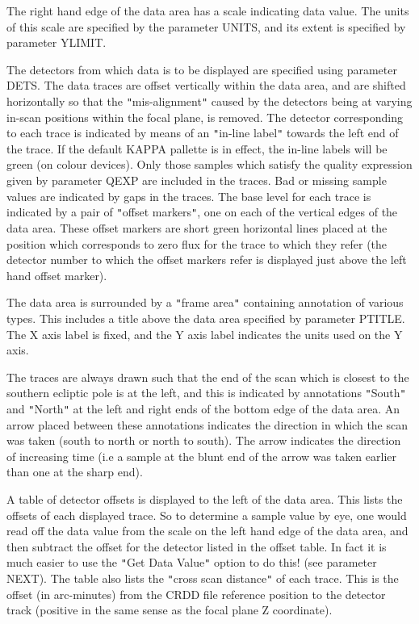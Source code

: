 \documentclass[11pt,nolof,noabs]{starlink}
\begin{document}
\begin{small}
{{      The right hand edge of the data area has a scale indicating data
      value. The units of this scale are specified by the parameter
      UNITS, and its extent is specified by parameter YLIMIT.

      The detectors from which data is to be displayed are specified
      using parameter DETS. The data traces are offset vertically
      within the data area, and are shifted horizontally so that the
      \texttt{"}mis-alignment\texttt{"} caused by the detectors being at varying in-scan
      positions within the focal plane, is removed. The detector
      corresponding to each trace is indicated by means of an \texttt{"}in-line
      label\texttt{"} towards the left end of the trace. If the default KAPPA
      pallette is in effect, the in-line labels will be green (on
      colour devices). Only those samples which satisfy the quality
      expression given by parameter QEXP are included in the traces.
      Bad or missing sample values are indicated by gaps in the traces.
      The base level for each trace is indicated by a pair of \texttt{"}offset
      markers\texttt{"}, one on each of the vertical edges of the data area.
      These offset markers are short green horizontal lines placed at
      the position which corresponds to zero flux for the trace to
      which they refer (the detector number to which the offset markers
      refer is displayed just above the left hand offset marker).

      The data area is surrounded by a \texttt{"}frame area\texttt{"} containing
      annotation of various types. This includes a title above the data
      area specified by parameter PTITLE. The X axis label is fixed, and
      the Y axis label indicates the units used on the Y axis.

      The traces are always drawn such that the end of the scan which is
      closest to the southern ecliptic pole is at the left, and this is
      indicated by annotations \texttt{"}South\texttt{"} and \texttt{"}North\texttt{"} at the left and right
      ends of the bottom edge of the data area. An arrow placed between
      these annotations indicates the direction in which the scan was
      taken (south to north or north to south). The arrow indicates the
      direction of increasing time (i.e a sample at the blunt end of
      the arrow was taken earlier than one at the sharp end).

      A table of detector offsets is displayed to the left of the data
      area. This lists the offsets of each displayed trace. So to
      determine a sample value by eye, one would read off the data value
      from the scale on the left hand edge of the data area, and then
      subtract the offset for the detector listed in the offset table.
      In fact it is much easier to use the \texttt{"}Get Data Value\texttt{"} option to do
      this! (see parameter NEXT). The table also lists the \texttt{"}cross scan
      distance\texttt{"} of each trace. This is the offset (in arc-minutes) from
      the CRDD file reference position to the detector track (positive
      in the same sense as the focal plane Z coordinate).

}}
\end{small}
\end{document}
